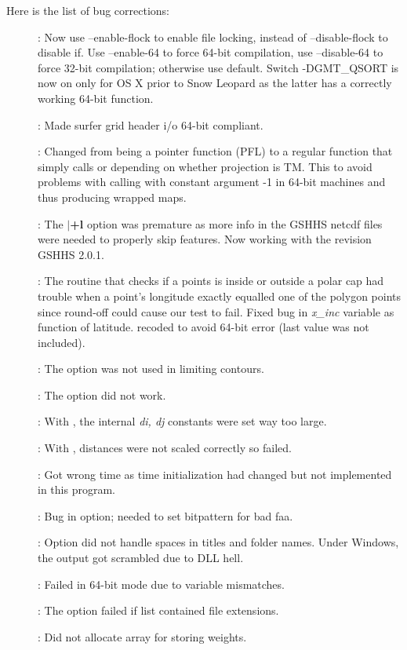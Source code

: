 Here is the list of bug corrections:
\begin{description}
	\item []:	Now use --enable-flock to enable file locking, instead of
		--disable-flock to disable if.
		Use --enable-64 to force 64-bit compilation, use --disable-64
		to force 32-bit compilation; otherwise use default.
		Switch -DGMT\_QSORT is now on only for OS X prior to Snow Leopard as the latter has
		a correctly working 64-bit  function.
	\item []:	Made surfer grid header i/o 64-bit compliant.
	\item []:	Changed  from being a pointer function (PFL)
		to a regular function that simply calls 
		or  depending on whether projection is TM.
		This to avoid problems with calling  with
		constant argument -1 in 64-bit machines and thus producing wrapped  maps.
	\item []:	The $|${\bf +l} option was premature as more info in the GSHHS
	netcdf files were needed to properly skip features. Now working with the revision GSHHS 2.0.1.
	\item []: The routine that checks if a points is inside or outside a
		polar cap had trouble when a point's longitude exactly
		equalled one of the polygon points since round-off could 
		cause our test to fail.
		Fixed bug in {\it x\_inc} variable as function of latitude.
		 recoded to avoid 64-bit error (last value was not included).
	\item []: The  option was not used in limiting contours.
	\item []: The  option did not work.
	\item []: With , the internal {\it di, dj} constants were set way too large.
	\item []: With , distances were not scaled correctly
		so  failed.
	\item []: Got wrong time as time initialization had changed but
		not implemented in this program.
	\item []: Bug in  option; needed to set bitpattern for bad faa.
	\item []: Option  did not handle spaces in titles and folder names.
		Under Windows, the output got scrambled due to DLL hell.
	\item []: Failed in 64-bit mode due to variable mismatches.
	\item []: The  option failed if list contained file extensions.
	\item []: Did not allocate array for storing weights.
\end{description}

